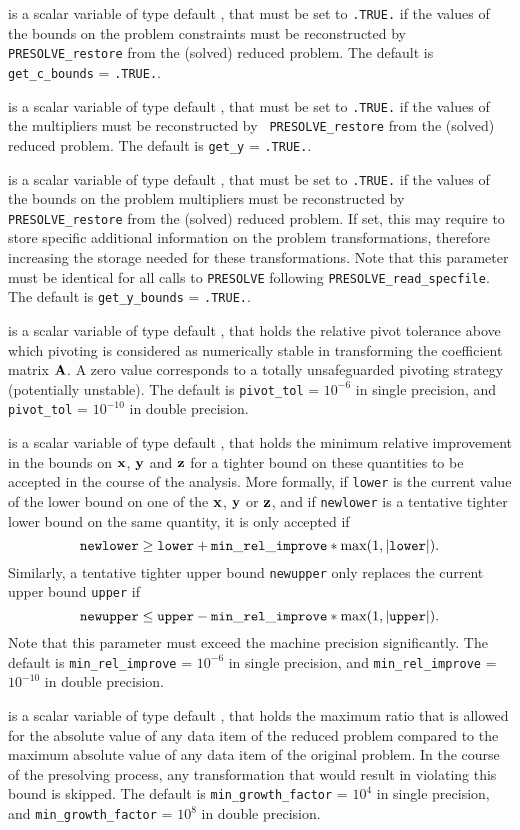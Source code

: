 \documentclass{galahad}
\newcommand{\packagename}{PRESOLVE}
\begin{document}
\begin{description}
 is a scalar variable of type default \logical, that
must be set to {\tt .TRUE.} if the values of the bounds on the
problem constraints must be reconstructed by {\tt \packagename\_restore}
from the (solved) reduced problem.
The default is {\tt get\_c\_bounds} = {\tt .TRUE.}.

 is a scalar variable of type default \logical, that
must be set to {\tt .TRUE.} if the values of the multipliers
must be reconstructed by {\tt
\packagename\_restore} from the (solved) reduced problem.
The default is {\tt get\_y} = {\tt .TRUE.}.

 is a scalar variable of type default \logical, that
must be set to {\tt .TRUE.} if the values of the bounds on the
problem multipliers must be reconstructed by {\tt \packagename\_restore}
from the (solved) reduced problem.
If set, this may require to store specific
additional information on the problem transformations,
therefore increasing the storage needed for these transformations.
Note that this parameter must be identical for all calls to
{\tt \packagename} following {\tt \packagename\_read\_specfile}.
The default is {\tt get\_y\_bounds} = {\tt .TRUE.}.

 is a scalar variable of type default \realdp, that
holds the relative pivot tolerance above which pivoting is
considered as numerically stable in transforming the
coefficient matrix ${\mathbf{A}}$.  A zero value corresponds to a
totally unsafeguarded pivoting strategy (potentially unstable).
The default is {\tt pivot\_tol} = $10^{-6}$ in single precision, and
{\tt pivot\_tol} = $10^{-10}$ in double precision.

  is a scalar variable of type default
\realdp, that holds the minimum relative improvement in the bounds on ${\mathbf{x}}$,
${\mathbf{y}}$ and ${\mathbf{z}}$ for a tighter bound on these quantities to be
accepted in the course of the analysis.  More formally,
if {\tt lower} is the current value of the lower bound on one
of the ${\mathbf{x}}$, ${\mathbf{y}}$ or ${\mathbf{z}}$, and if {\tt newlower} is a tentative tighter
lower bound on the same quantity, it is only accepted if
\[
{\tt newlower} \geq
{\tt lower} + {\tt min\_rel\_improve} * \max( 1, |{\tt lower}|).
\]
Similarly, a tentative tighter upper bound {\tt newupper}
only replaces the current upper bound {\tt upper} if
\[
{\tt newupper} \leq
{\tt upper} - {\tt min\_rel\_improve} * \max( 1, |{\tt upper}|).
\]
Note that this parameter must exceed the machine precision significantly.
The default is {\tt min\_rel\_improve} = $10^{-6}$ in single
precision, and {\tt min\_rel\_improve} = $10^{-10}$ in double
precision.

 is a scalar variable of type default
\realdp, that holds the maximum ratio that is allowed for the absolute
value of any data item of the reduced problem compared to the maximum
absolute value of any data item of the original problem.  In the
course of the presolving process, any transformation that would result in
violating this bound is skipped.
The default is {\tt min\_growth\_factor} = $10^{4}$ in single
precision, and {\tt min\_growth\_factor} = $10^{8}$ in double
precision.

\end{description}
\end{document}

